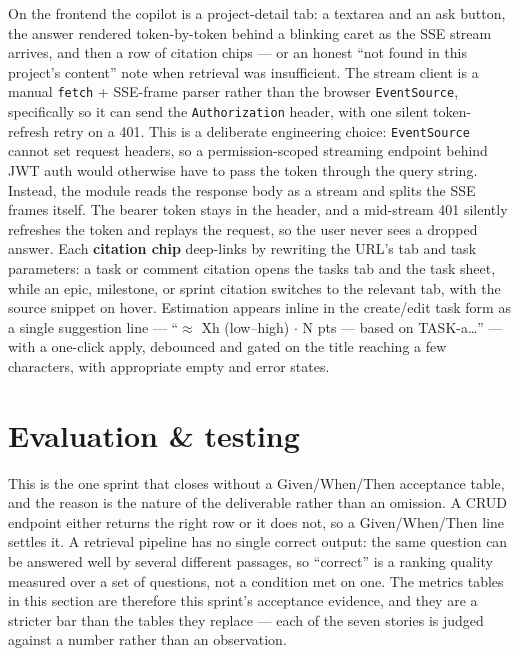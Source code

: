 On the frontend the copilot is a project-detail tab: a textarea and an ask button, the answer rendered
token-by-token behind a blinking caret as the SSE stream arrives, and then a row of citation chips --- or an
honest ``not found in this project's content'' note when retrieval was insufficient. The stream client is a
manual \texttt{fetch} + SSE-frame parser rather than the browser \texttt{EventSource}, specifically so it can send the
\texttt{Authorization} header, with one silent token-refresh retry on a 401. This is a deliberate engineering
choice: \texttt{EventSource} cannot set request headers, so a permission-scoped streaming endpoint behind JWT
auth would otherwise have to pass the token through the query string. Instead, the module reads the response
body as a stream and splits the SSE frames itself. The bearer token stays in the header, and a mid-stream 401
silently refreshes the token and replays the request, so the user never sees a dropped answer.
Each \textbf{citation chip} deep-links by
rewriting the URL's tab and task parameters: a task or comment citation opens the tasks tab and the task
sheet, while an epic, milestone, or sprint citation switches to the relevant tab, with the source snippet on
hover. Estimation appears inline in the create/edit task form as a single suggestion line --- ``$\approx$ Xh (low--high) $\cdot$
N pts --- based on TASK-a\ldots'' --- with a one-click apply, debounced and gated on the title reaching a few
characters, with appropriate empty and error states.




\section{Evaluation \& testing}

This is the one sprint that closes without a Given/When/Then acceptance table, and the reason is
the nature of the deliverable rather than an omission. A CRUD endpoint either returns the right
row or it does not, so a Given/When/Then line settles it. A retrieval pipeline has no single
correct output: the same question can be answered well by several different passages, so
``correct'' is a ranking quality measured over a set of questions, not a condition met on one.
The metrics tables in this section are therefore this sprint's acceptance evidence, and they are
a stricter bar than the tables they replace --- each of the seven stories is judged against a
number rather than an observation.

